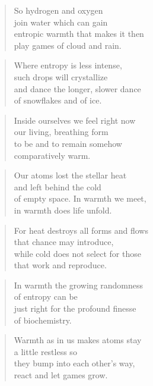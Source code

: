 \documentclass[10pt,a4paper]{article}
\begin{document}
\begin{paracol}{2}
\begin{verse}
So hydrogen and oxygen\\
join water which can gain\\
entropic warmth that makes it then\\
play games of cloud and rain.
\end{verse}

\begin{verse}
Where entropy is less intense,\\
such drops will crystallize\\
and dance the longer, slower dance\\
of snowflakes and of ice.
\end{verse}

\begin{verse}
Inside ourselves we feel right now\\
our living, breathing form\\
to be and to remain somehow\\
comparatively warm.
\end{verse}

\begin{verse}
Our atoms lost the stellar heat\\
and left behind the cold\\
of empty space. In warmth we meet,\\
in warmth does life unfold.
\end{verse}

\begin{verse}
For heat destroys all forms and flows\\
that chance may introduce,\\
while cold does not select for those\\
that work and reproduce.
\end{verse}

\begin{verse}
In warmth the growing randomness\\
of entropy can be\\
just right for the profound finesse\\
of biochemistry.
\end{verse}

\begin{verse}
Warmth as in us makes atoms stay\\
a little restless so\\
they bump into each other’s way,\\
react and let games grow.
\end{verse}


\end{paracol}
\end{document}
